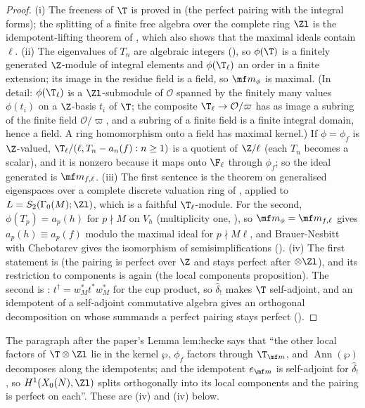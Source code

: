 \begin{proof}
(i) The freeness of $\T$ is proved in  (the perfect pairing with the integral forms); the splitting of a finite free algebra over the complete ring $\Zl$
is the idempotent-lifting theorem of , which also shows that the maximal ideals contain $\ell$. (ii) The eigenvalues of $T_n$ are algebraic integers
(), so $\phi(\T)$ is a finitely generated $\Z$-module of integral elements and $\phi(\T_\ell)$ an order in a finite extension; its image in the residue field is
a field, so $\mf m_\phi$ is maximal. (In detail: $\phi(\T_\ell)$ is a $\Zl$-submodule of $\mathcal O$ spanned by the finitely many values $\phi(t_i)$ on a $\Z$-basis $t_i$ of $\T$; the
composite $\T_\ell\to\mathcal O/\varpi$ has as image a subring of the finite field $\mathcal O/\varpi$, and a subring of a finite field is a finite integral domain, hence a field. A ring
homomorphism onto a field has maximal kernel.) If $\phi=\phi_f$ is $\Z$-valued, $\T_\ell/(\ell,T_n-a_n(f):n\ge1)$ is a quotient of $\Z/\ell$ (each $T_n$ becomes a scalar), and it is nonzero
because it maps onto $\F_\ell$ through $\phi_f$; so the ideal generated is $\mf m_{f,\ell}$. (iii) The first sentence is the theorem on generalised eigenspaces over a complete
discrete valuation ring of , applied to $L=S_2(\Gamma_0(M);\Zl)$, which is a faithful $\T_\ell$-module. For the second, $\phi(T_p)=a_p(h)$ for $p\nmid M$ on $V_h$
(multiplicity one, ), so $\mf m_\phi=\mf m_{f,\ell}$ gives $a_p(h)\equiv a_p(f)$ modulo the maximal ideal for $p\nmid M\ell$, and Brauer-Nesbitt with Chebotarev gives the
isomorphism of semisimplifications (). (iv) The first statement is  (the pairing is perfect over $\Z$ and stays perfect after $\otimes\Zl$), and
its restriction to components is  again (the local components proposition). The second is : $t^\dagger=w_M^*t^*w_M^*$ for the cup product, so
$\hat\delta_!$ makes $\T$ self-adjoint, and an idempotent of a self-adjoint commutative algebra gives an orthogonal decomposition on whose summands a perfect
pairing stays perfect ().
\end{proof}

\begin{paperlink}
The paragraph after the paper's Lemma lem:hecke says that ``the other local factors of $\T\otimes\Zl$ lie in the kernel $\wp$, $\phi_f$ factors through $\T_{\mf m}$, and
$\operatorname{Ann}(\wp)$ decomposes along the idempotents; and the idempotent $e_{\mf m}$ is self-adjoint for $\hat\delta_!$, so $H^1(X_0(N),\Zl)$ splits orthogonally into its local
components and the pairing is perfect on each''. These are (iv) and (iv) below.
\end{paperlink}

